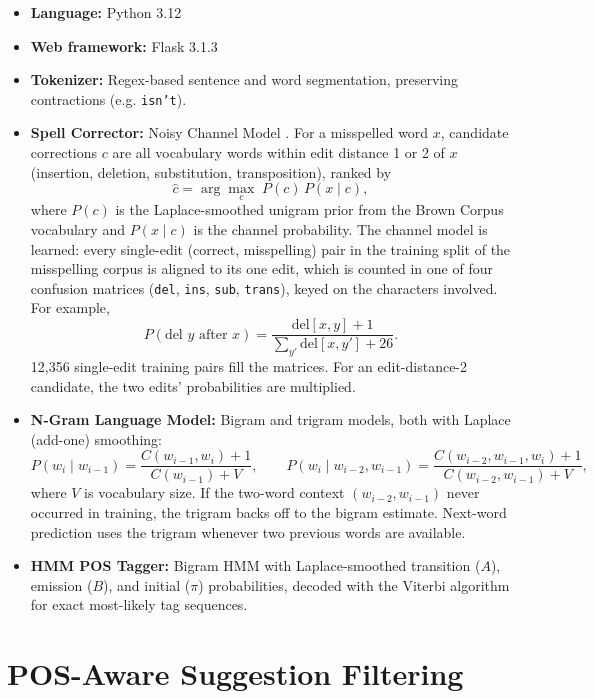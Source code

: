 \documentclass[12pt,a4paper]{report}
\begin{document}
\begin{itemize}
    \item \textbf{Language:} Python 3.12
    \item \textbf{Web framework:} Flask 3.1.3
    \item \textbf{Tokenizer:} Regex-based sentence and word segmentation,
    preserving contractions (e.g. \texttt{isn't}).
    \item \textbf{Spell Corrector:} Noisy Channel Model
    \cite{kernighan1990}. For a misspelled word $x$, candidate corrections
    $c$ are all vocabulary words within edit distance 1 or 2 of $x$
    (insertion, deletion, substitution, transposition), ranked by
    \[
    \hat{c} = \arg\max_{c}\; P(c)\,P(x \mid c),
    \]
    where $P(c)$ is the Laplace-smoothed unigram prior from the Brown
    Corpus vocabulary and $P(x \mid c)$ is the channel probability. The
    channel model is learned: every single-edit (correct, misspelling)
    pair in the training split of the misspelling corpus is aligned to
    its one edit, which is counted in one of four confusion matrices
    (\texttt{del}, \texttt{ins}, \texttt{sub}, \texttt{trans}), keyed on
    the characters involved. For example,
    \[
    P(\text{del } y \text{ after } x) =
    \frac{\mathrm{del}[x,y] + 1}{\sum_{y'} \mathrm{del}[x,y'] + 26}.
    \]
    12,356 single-edit training pairs fill the matrices. For an
    edit-distance-2 candidate, the two edits' probabilities are
    multiplied.
    \item \textbf{N-Gram Language Model:} Bigram and trigram models,
    both with Laplace (add-one) smoothing:
    \[
    P(w_i \mid w_{i-1}) = \frac{C(w_{i-1}, w_i) + 1}{C(w_{i-1}) + V},
    \qquad
    P(w_i \mid w_{i-2}, w_{i-1}) =
    \frac{C(w_{i-2}, w_{i-1}, w_i) + 1}{C(w_{i-2}, w_{i-1}) + V},
    \]
    where $V$ is vocabulary size. If the two-word context
    $(w_{i-2}, w_{i-1})$ never occurred in training, the trigram
    backs off to the bigram estimate. Next-word prediction uses the
    trigram whenever two previous words are available.
    \item \textbf{HMM POS Tagger:} Bigram HMM with Laplace-smoothed
    transition ($A$), emission ($B$), and initial ($\pi$) probabilities,
    decoded with the Viterbi algorithm for exact most-likely tag
    sequences.
\end{itemize}

\section{POS-Aware Suggestion Filtering}
\label{sec:pos-filter}
\end{document}
